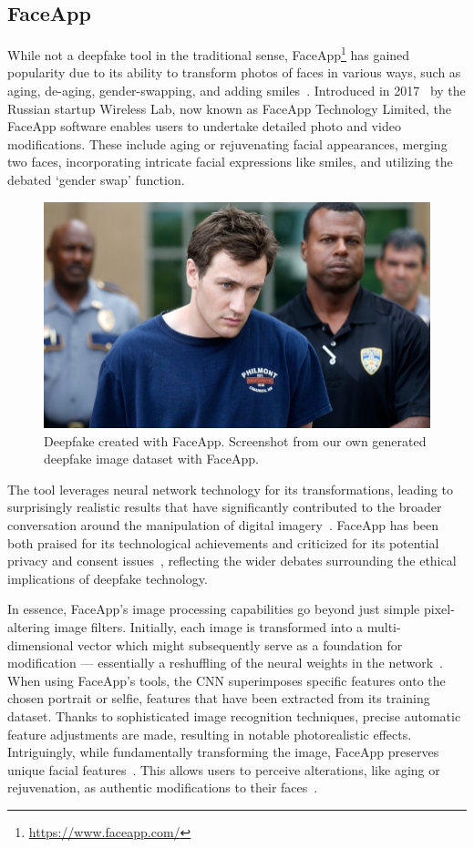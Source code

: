 \subsection{FaceApp}\label{sec:faceapp}
While not a deepfake tool in the traditional sense,
FaceApp\footnote{\url{https://www.faceapp.com/}} has gained popularity due
to its ability to transform photos of faces in various ways, such as aging,
de-aging, gender-swapping, and adding smiles~\cite{wirth2023interface}.
Introduced in 2017~\cite{wirth2023interface} by the Russian startup Wireless Lab, now known
as FaceApp Technology Limited, the FaceApp software enables users to undertake
detailed photo and video modifications. These include aging or rejuvenating facial
appearances, merging two faces, incorporating intricate facial expressions like smiles,
and utilizing the debated `gender swap' function.

\begin{figure}[htpb]
	\centering
	\includegraphics[width=0.61\columnwidth]{figures/faceapp}
	\caption{Deepfake created with FaceApp. Screenshot from our own generated deepfake image
		dataset with FaceApp.}
\end{figure}

The tool leverages neural network technology for its transformations, leading to surprisingly
realistic results that have significantly contributed to the broader conversation
around the manipulation of digital imagery~\cite{faceapp}. FaceApp has
been both praised for its technological achievements and criticized for
its potential privacy and consent issues~\cite{warzel2019faceapp}, reflecting the wider debates
surrounding the ethical implications of deepfake technology.

In essence, FaceApp's image processing capabilities go beyond just simple pixel-altering
image filters. Initially, each image is transformed into a multi-dimensional vector which
might subsequently serve as a foundation for modification --- essentially a reshuffling
of the neural weights in the network~\cite{faceapp-article1}. When using FaceApp's tools,
the \ac{CNN} superimposes specific features onto the chosen portrait or selfie, features
that have been extracted from its training dataset. Thanks to sophisticated image recognition
techniques, precise automatic feature adjustments are made, resulting in notable photorealistic
effects. Intriguingly, while fundamentally transforming the image, FaceApp preserves
unique facial features~\cite{faceapp-medium}. This allows users to perceive alterations, like aging or
rejuvenation, as authentic modifications to their faces~\cite{wirth2023interface,faceapp-article2}.

